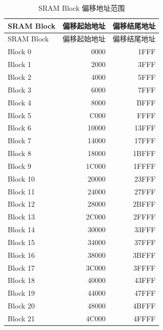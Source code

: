 \documentclass[main\_\_CN.tex]{subfiles}
\begin{document}
\begin{longtable}[c]{|p{3cm}|r|r|}
    \caption{SRAM Block 偏移地址范围}
    \label{table:SRAM_block_address}
    \\\hline
    \rowcolor{lightgray}
    SRAM Block & 偏移起始地址 & 偏移结尾地址 \\
    \hline
    \endfirsthead
    \hline
    \rowcolor{lightgray}
    SRAM Block & 偏移起始地址 & 偏移结尾地址 \\
    \hline
    \endhead
    \endfoot
    \hline
    \endlastfoot
    Block 0 & \hexprefix{}0000 & \hexprefix{}1FFF  \\\hline
    Block 1 & \hexprefix{}2000 & \hexprefix{}3FFF  \\\hline
    Block 2 & \hexprefix{}4000 & \hexprefix{}5FFF \\\hline
    Block 3 & \hexprefix{}6000 & \hexprefix{}7FFF  \\\hline
    Block 4 & \hexprefix{}8000 & \hexprefix{}BFFF  \\\hline
    Block 5 & \hexprefix{}C000 & \hexprefix{}FFFF  \\\hline
    Block 6 & \hexprefix{}10000 & \hexprefix{}13FFF  \\\hline
    Block 7 & \hexprefix{}14000 & \hexprefix{}17FFF  \\\hline
    Block 8 & \hexprefix{}18000 & \hexprefix{}1BFFF  \\\hline
    Block 9 & \hexprefix{}1C000 & \hexprefix{}1FFFF  \\\hline
    Block 10 & \hexprefix{}20000 & \hexprefix{}23FFF  \\\hline
    Block 11 & \hexprefix{}24000 & \hexprefix{}27FFF  \\\hline
    Block 12 & \hexprefix{}28000 & \hexprefix{}2BFFF  \\\hline
    Block 13 & \hexprefix{}2C000 & \hexprefix{}2FFFF  \\\hline
    Block 14 & \hexprefix{}30000 & \hexprefix{}33FFF  \\\hline
    Block 15 & \hexprefix{}34000 & \hexprefix{}37FFF  \\\hline
    Block 16 & \hexprefix{}38000 & \hexprefix{}3BFFF  \\\hline
    Block 17 & \hexprefix{}3C000 & \hexprefix{}3FFFF  \\\hline
    Block 18 & \hexprefix{}40000 & \hexprefix{}43FFF  \\\hline
    Block 19 & \hexprefix{}44000 & \hexprefix{}47FFF  \\\hline
    Block 20 & \hexprefix{}48000 & \hexprefix{}4BFFF  \\\hline
    Block 21 & \hexprefix{}4C000 & \hexprefix{}4FFFF  \\\hline

\end{longtable}
\end{document}
